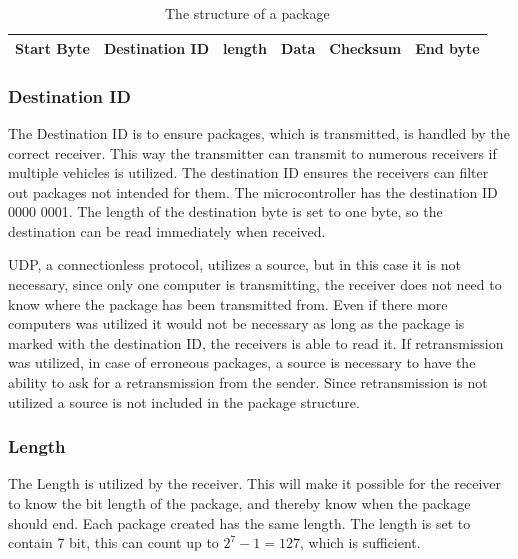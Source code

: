 \begin{table}[H]\centering
\begin{tabular}{|>{\centering\arraybackslash}m{2cm}|>{\centering\arraybackslash}m{3cm}|>{\centering\arraybackslash}m{2cm}|>{\centering\arraybackslash}m{2cm}|>{\centering\arraybackslash}m{2cm}|>{\centering\arraybackslash}m{2cm}|}
\hline
Start Byte & Destination ID & length & Data & Checksum & End byte \\
\hline
\end{tabular}
\caption{The structure of a package}
\label{CoorSetup}
\end{table}

\subsubsection{Destination ID}
The Destination ID is to ensure packages, which is transmitted, is handled by the correct receiver. This way the transmitter can transmit to numerous receivers if multiple vehicles is utilized. The destination ID ensures the receivers can filter out packages not intended for them. The microcontroller has the destination ID 0000 0001. The length of the destination byte is set to one byte, so the destination can be read immediately when received.

UDP, a connectionless protocol, utilizes a source, but in this case it is not necessary, since only one computer is transmitting, the receiver does not need to know where the package has been transmitted from. Even if there more computers was utilized it would not be necessary as long as the package is marked with the destination ID, the receivers is able to read it. If retransmission was utilized, in case of erroneous packages, a source is necessary to have the ability to ask for a retransmission from the sender. Since retransmission is not utilized a source is not included in the package structure.

\subsubsection{Length}
The Length is utilized by the receiver. This will make it possible for the receiver to know the bit length of the package, and thereby know when the package should end. Each package created has the same length. The length is set to contain 7 bit, this can count up to $2^{7}-1 = 127$, which is sufficient.

